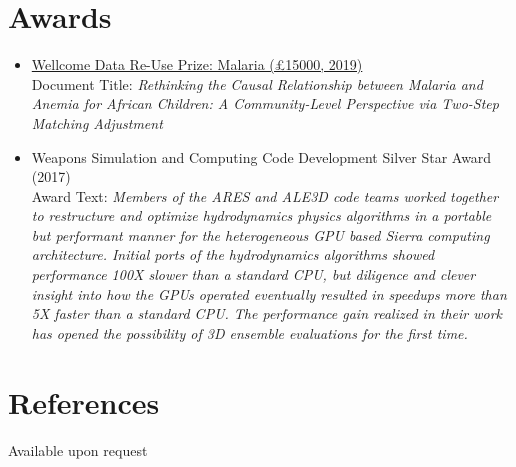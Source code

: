 \documentclass[10pt]{article} %
\begin{document}
\section{Awards}
\begin{itemize}
    \item \href{https://wellcome.ac.uk/news/new-data-re-use-prizes-help-unlock-value-research}{ Wellcome Data Re-Use Prize: Malaria (\pounds 15000, 2019)}\\[5pt]
    Document Title: \textit{Rethinking the Causal Relationship between Malaria and Anemia for African Children: A Community-Level Perspective via Two-Step Matching Adjustment}
    \item Weapons Simulation and Computing Code Development Silver Star Award (2017)\\[5pt]
    Award Text: \textit{Members of the ARES and ALE3D code teams worked together to restructure and optimize hydrodynamics physics algorithms in a portable but performant manner for the heterogeneous GPU based Sierra computing architecture. Initial ports of the hydrodynamics algorithms showed performance 100X slower than a standard CPU, but diligence and clever insight into how the GPUs operated eventually resulted in speedups more than 5X faster than a standard CPU. The performance gain realized in their work has opened the possibility of 3D ensemble evaluations for the first time.}
\end{itemize}

\section{References}
Available upon request

\end{document}
